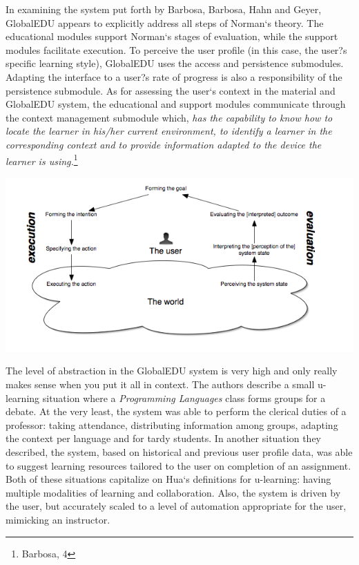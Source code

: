 \documentclass[twoside]{article}
\begin{document}
\begin{multicols}{2}
\setlength\parindent{24pt}In examining the system put forth by Barbosa, Barbosa, Hahn and Geyer, GlobalEDU appears to explicitly address all steps of Norman`s theory. The educational modules support Norman`s stages of evaluation, while the support modules facilitate execution. To perceive the user profile (in this case, the user?s specific learning style), GlobalEDU uses the access and persistence submodules. Adapting the interface to a user?s rate of progress is also a responsibility of the persistence submodule. As for assessing the user`s context in the material and GlobalEDU system, the educational and support modules communicate through the context management submodule which, \emph{has the capability to know how to locate the learner in his/her current environment, to identify a learner in the corresponding context and to provide information adapted to the device the learner is using.}\footnote{Barbosa, 4}
 \begin{flushleft}
\includegraphics[scale=0.35,left]{3} 
\end{flushleft}

\setlength\parindent{24pt}The level of abstraction in the GlobalEDU system is very high and only really makes sense when you put it all in context. The authors describe a small u-learning situation where a \emph{Programming Languages} class forms groups for a debate. At the very least, the system was able to perform the clerical duties of a professor: taking attendance, distributing information among groups, adapting the context per language and for tardy students. In another situation they described, the system, based on historical and previous user profile data, was able to suggest learning resources tailored to the user on completion of an assignment. Both of these situations capitalize on Hua`s definitions for u-learning: having multiple modalities of learning and collaboration. Also, the system is driven by the user, but accurately scaled to a level of automation appropriate for the user, mimicking an instructor.


\end{multicols}
\end{document}
